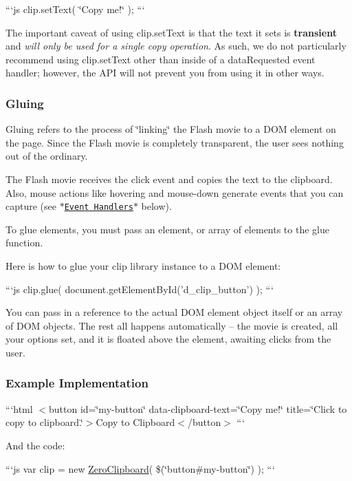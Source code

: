 \begin{DoxyEnumerate}
```js clip.\-set\-Text( \char`\"{}\-Copy me!\char`\"{} ); ```

The important caveat of using {\ttfamily clip.\-set\-Text} is that the text it sets is {\bfseries transient} and {\itshape will only be used for a single copy operation}. As such, we do not particularly recommend using {\ttfamily clip.\-set\-Text} other than inside of a {\ttfamily data\-Requested} event handler; however, the A\-P\-I will not prevent you from using it in other ways.
\end{DoxyEnumerate}

\subsubsection*{Gluing}

Gluing refers to the process of \char`\"{}linking\char`\"{} the Flash movie to a D\-O\-M element on the page. Since the Flash movie is completely transparent, the user sees nothing out of the ordinary.

The Flash movie receives the click event and copies the text to the clipboard. Also, mouse actions like hovering and mouse-\/down generate events that you can capture (see $\ast$\href{#event-handlers}{\tt Event Handlers}$\ast$ below).

To glue elements, you must pass an element, or array of elements to the glue function.

Here is how to glue your clip library instance to a D\-O\-M element\-:

```js clip.\-glue( document.\-get\-Element\-By\-Id('d\-\_\-clip\-\_\-button') ); ```

You can pass in a reference to the actual D\-O\-M element object itself or an array of D\-O\-M objects. The rest all happens automatically -- the movie is created, all your options set, and it is floated above the element, awaiting clicks from the user.

\subsubsection*{Example Implementation}

```html $<$button id=\char`\"{}my-\/button\char`\"{} data-\/clipboard-\/text=\char`\"{}\-Copy me!\char`\"{} title=\char`\"{}\-Click to copy to clipboard.\char`\"{}$>$Copy to Clipboard$<$/button$>$ ```

And the code\-:

```js var clip = new \hyperlink{class_zero_clipboard}{Zero\-Clipboard}( \$(\char`\"{}button\#my-\/button\char`\"{}) ); ```

